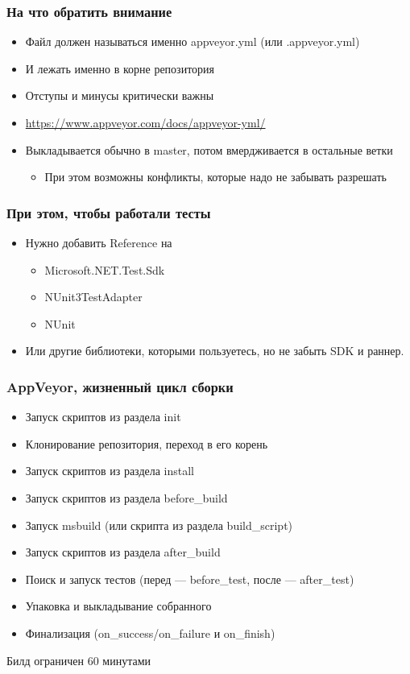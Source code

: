 \documentclass[xetex,mathserif,serif]{beamer}
\begin{document}
    \begin{frame}
        \frametitle{На что обратить внимание}
        \begin{itemize}
            \item Файл должен называться именно appveyor.yml (или .appveyor.yml)
            \item И лежать именно в корне репозитория
            \item Отступы и минусы критически важны
            \item \url{https://www.appveyor.com/docs/appveyor-yml/}
            \item Выкладывается обычно в master, потом вмердживается в остальные ветки
            \begin{itemize}
                \item При этом возможны конфликты, которые надо не забывать разрешать
            \end{itemize}
        \end{itemize}
    \end{frame}

    \begin{frame}
        \frametitle{При этом, чтобы работали тесты}
        \begin{itemize}
            \item Нужно добавить Reference на
            \begin{itemize}
                \item Microsoft.NET.Test.Sdk
                \item NUnit3TestAdapter
                \item NUnit
            \end{itemize}
            \item Или другие библиотеки, которыми пользуетесь, но не забыть SDK и раннер.
        \end{itemize}
    \end{frame}

    \begin{frame}
        \frametitle{AppVeyor, жизненный цикл сборки}
        \begin{itemize}
            \item Запуск скриптов из раздела init
            \item Клонирование репозитория, переход в его корень
            \item Запуск скриптов из раздела install
            \item Запуск скриптов из раздела before\_build
            \item Запуск msbuild (или скрипта из раздела build\_script)
            \item Запуск скриптов из раздела after\_build 
            \item Поиск и запуск тестов (перед --- before\_test, после --- after\_test)
            \item Упаковка и выкладывание собранного
            \item Финализация (on\_success/on\_failure и on\_finish)
        \end{itemize}
        Билд ограничен 60 минутами
    \end{frame}
\end{document}
